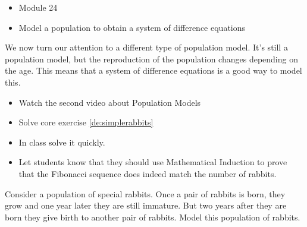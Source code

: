 \begin{lesson}

	\begin{itemize}
		\item Module 24
	\end{itemize}

	\begin{itemize}
		\item Model a population to obtain a system of difference equations
	\end{itemize}
	

We now turn our attention to a different type of population model. 
It's still a population model, but the reproduction of the population changes depending on the age.
This means that a system of difference equations is a good way to model this.

\begin{itemize}
	\item Watch the second video about Population Models
	\item Solve core exercise \ref{de:simplerabbits}
\end{itemize}
\end{lesson}



\begin{annotation}
	\begin{goals}
		\begin{itemize}
			\item In class solve it quickly.
			\item Let students know that they should use Mathematical Induction to prove that the Fibonacci sequence does indeed match the number of rabbits.
		\end{itemize}
\end{goals}
\end{annotation}
\question \label{de:simplerabbits}
	Consider a population of special rabbits. Once a pair of rabbits is born, they grow and one year later they are still immature. But two years after they are born they give birth to another pair of rabbits.
	Model this population of rabbits.

	


\bookonlynewpage


